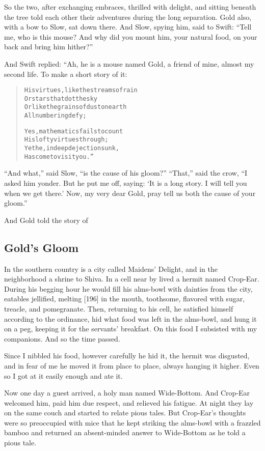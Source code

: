 \documentclass[article, twoside, 14pt]{memoir}
\renewenvironment{verbatim}{%
\begin{quote}%
\vskip -10pt%
\begin{alltt}\normalfont\large}{\end{alltt}%
\end{quote}%
\vskip -10pt
} %
\begin{document}
So the two, after exchanging embraces, thrilled with delight, and
sitting beneath the tree told each other their adventures during
the long separation. Gold also, with a bow to Slow, sat down there.
And Slow, spying him, said to Swift:
``Tell me, who is this mouse? And why did you mount him, your natural food, on your back and bring him hither?''

And Swift replied: “Ah, he is a mouse named Gold, a friend of mine,
almost my second life. To make a short story of it:

\begin{verbatim}
His virtues, like the streams of rain
    Or stars that dot the sky
Or like the grains of dust on earth
    All numbering defy;

Yes, mathematics fails to count
    His lofty virtues through;
Yet he, in deep dejection sunk,
    Has come to visit you.”
\end{verbatim}
``And what,'' said Slow, ``is the cause of his gloom?'' ``That,''
said the crow,
``I asked him yonder. But he put me off, saying: `It is a long story. I will tell you when we get there.' Now, my very dear Gold, pray tell us both the cause of your gloom.''

And Gold told the story of

\subsection{Gold's Gloom}

\label{s38}

In the southern country is a city called Maidens' Delight, and in
the neighborhood a shrine to Shiva. In a cell near by lived a
hermit named Crop-Ear. During his begging hour he would fill his
alms-bowl with dainties from the city, eatables jellified, melting
[196] in the mouth, toothsome, flavored with sugar, treacle, and
pomegranate. Then, returning to his cell, he satisfied himself
according to the ordinance, hid what food was left in the
alms-bowl, and hung it on a peg, keeping it for the servants'
breakfast. On this food I subsisted with my companions. And so the
time passed.

Since I nibbled his food, however carefully he hid it, the hermit
was disgusted, and in fear of me he moved it from place to place,
always hanging it higher. Even so I got at it easily enough and ate
it.

Now one day a guest arrived, a holy man named Wide-Bottom. And
Crop-Ear welcomed him, paid him due respect, and relieved his
fatigue. At night they lay on the same couch and started to relate
pious tales. But Crop-Ear's thoughts were so preoccupied with mice
that he kept striking the alms-bowl with a frazzled bamboo and
returned an absent-minded answer to Wide-Bottom as he told a pious
tale.
\end{document}
